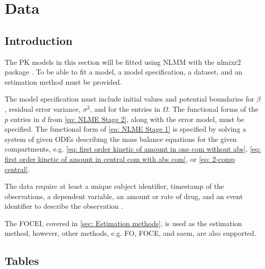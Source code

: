 \chapter{Data}
\section{Introduction}
The PK models in this section will be fitted using NLMM with the nlmixr2 package \citep{nlmixr, nlmixrarticle}. To be able to fit a model, a model specification, a dataset, and an estimation method must be provided.

The model specification must include initial values and potential boundaries for $\beta$, residual error variance, $\sigma^2$, and for the entries in $\Omega$. The functional forms of the $p$ entries in $d$ from \eqref{eq: NLME Stage 2}, along with the error model, must be specified.
The functional form of \ref{eq: NLME Stage 1} is specified by solving a system of given ODEs describing the mass balance equations for the given compartments, e.g. \eqref{eq: first order kinetic of amount in one com without abs}, \eqref{eq: first order kinetic of amount in central com with abs com}, or \eqref{eq: 2-comp central}.

The data require at least a unique subject identifier, timestamp of the observations, a dependent variable, an amount or rate of drug, and an event identifier to describe the observation \citep{nlmixrarticle}. 

The FOCEI, covered in \ref{sec: Estimation methods}, is used as the estimation method, however, other methods, e.g. FO, FOCE, and saem, are also supported. 








\section{Tables}


